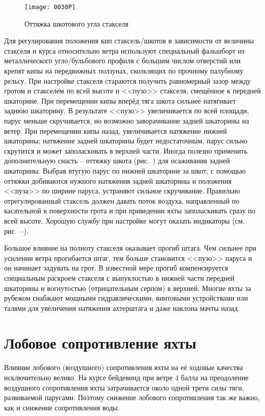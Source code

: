 \begin{figure}[htb]
  \centering
  \texttt{[image: 0030P]}
  \caption{Оттяжка шкотового угла стакселя}
  \label{fig:30}
\end{figure}

Для регулирования положения кип стаксель\-/шкотов в зависимости от величины стакселя и курса относительно ветра используют специальный фальшборт из металлического угло\-/бульбового профиля с большим числом отверстий или крепят кипы на передвижных ползунах, скользящих по прочному палубному рельсу. При настройке стакселя стараются получить равномерный зазор между гротом и стакселем по всей высоте и <<пузо>> стакселя, смещённое к передней шкаторине. При перемещении кипы вперёд тяга шкота сильнее натягивает заднюю шкаторину. В результате <<пузо>> увеличивается по всей площади, парус меньше скручивается, но возможно заворачивание задней шкаторины на ветер. При перемещении кипы назад, увеличивается натяжение нижней шкаторины; натяжение задней шкаторины будет недостаточным, парус сильно скрутится и может заполаскивать в верхней части. Иногда полезно применить дополнительную снасть \--- оттяжку шкота (рис.~) для осаживания задней шкаторины. Выбрав втугую парус по нижней шкаторине за шкот, с помощью оттяжки добиваются нужного натяжения задней шкаторины и положения <<пуза>> по ширине паруса, устраняют сильное скручивание. Правильно отрегулированный стаксель должен давать поток воздуха, направленный по касательной к поверхности грота и при приведении яхты заполаскивать сразу по всей высоте. Хорошую службу при настройке могут оказать индикаторы (см. рис.~--).

Большое влияние на полноту стакселя оказывает прогиб штага. Чем сильнее при усилении ветра прогибается штаг, тем больше становится <<пузо>> паруса и он начинает задувать на грот. В известной мере прогиб компенсируется специальным раскроем стакселя с выпуклостью в нижней части передней шкаторины и вогнутостью (отрицательным серпом) в верхней. Многие яхты за рубежом снабжают мощными гидравлическими, винтовыми устройствами или талями для увеличения натяжения ахтерштага и даже наклона мачты назад.

\section{Лобовое сопротивление яхты}

Влияние лобового (воздушного) сопротивления яхты на её ходовые качества исключительно велико. На курсе бейдевинд при ветре 4 балла на преодоление воздушного сопротивления яхты затрачивается около одной трети силы тяги, развиваемой парусами. Поэтому снижение лобового сопротивления так же важно, как и снижение сопротивления воды.

